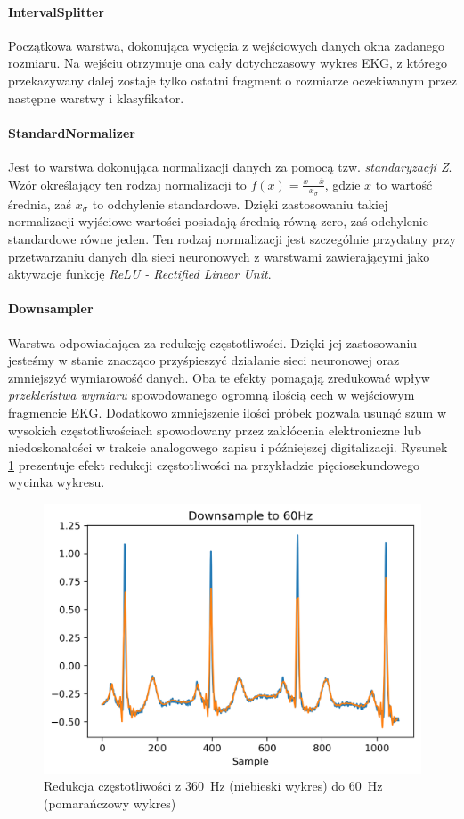 \documentclass[polish,12pt]{aghthesis}
\begin{document}
\paragraph{IntervalSplitter} Początkowa warstwa, dokonująca wycięcia z wejściowych danych okna zadanego rozmiaru. Na wejściu otrzymuje ona cały dotychczasowy wykres EKG, z którego przekazywany dalej zostaje tylko ostatni fragment o rozmiarze oczekiwanym przez następne warstwy i klasyfikator.

\paragraph{StandardNormalizer} Jest to warstwa dokonująca normalizacji danych za pomocą tzw. \emph{standaryzacji Z}. Wzór określający ten rodzaj normalizacji to $f(x) = \frac{x - \overline{x}}{x_{\sigma}}$, gdzie $\overline{x}$ to wartość średnia, zaś $x_\sigma$ to odchylenie standardowe. Dzięki zastosowaniu takiej normalizacji wyjściowe wartości posiadają średnią równą zero, zaś odchylenie standardowe równe jeden. Ten rodzaj normalizacji jest szczególnie przydatny przy przetwarzaniu danych dla sieci neuronowych z warstwami zawierającymi jako aktywacje funkcję \emph{ReLU - Rectified Linear Unit}.


\paragraph{Downsampler} Warstwa odpowiadająca za redukcję częstotliwości. Dzięki jej zastosowaniu jesteśmy w stanie znacząco przyśpieszyć działanie sieci neuronowej oraz zmniejszyć wymiarowość danych. Oba te efekty pomagają zredukować wpływ \emph{przekleństwa wymiaru} spowodowanego ogromną ilością cech w wejściowym fragmencie EKG. Dodatkowo zmniejszenie ilości próbek pozwala usunąć szum w wysokich częstotliwościach spowodowany przez zakłócenia elektroniczne lub niedoskonałości w trakcie analogowego zapisu i późniejszej digitalizacji.
Rysunek \ref{fig:downsampling} prezentuje efekt redukcji częstotliwości na przykładzie pięciosekundowego wycinka wykresu.

\begin{figure}[h!]
	\centering
	\captionsetup{justification=centering}
	\includegraphics[width=0.6\linewidth]{downsampling.png}
	\caption{Redukcja częstotliwości z \SI{360}{\hertz} (niebieski wykres) do \SI{60}{\hertz} (pomarańczowy wykres)}
	\label{fig:downsampling}
\end{figure}
\end{document}
